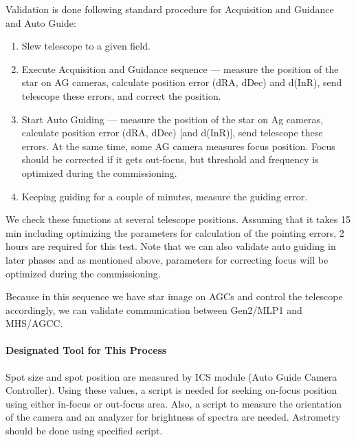 Validation is done following standard procedure for Acquisition and Guidance and Auto Guide:
\begin{enumerate}
\item Slew telescope to a given field.
\item Execute Acquisition and Guidance sequence --- measure the position of the star on AG cameras, calculate position error (dRA, dDec) and d(InR), send telescope these errors, and correct the position.
\item Start Auto Guiding --- measure the position of the star on Ag cameras, calculate position error (dRA, dDec) [and d(InR)], send telescope these errors.
At the same time, some AG camera measures focus position.
Focus should be corrected if it gets out-focus, but threshold and frequency is optimized during the commissioning.
\item Keeping guiding for a couple of minutes, measure the guiding error.
\end{enumerate}


We check these functions at several telescope positions.
Assuming that it takes 15 min including optimizing the parameters for calculation of the pointing errors, 2 hours are required for this test.
Note that we can also validate auto guiding in later phases and as mentioned above, parameters for correcting focus will be optimized during the commissioning.

\smallskip

Because in this sequence we have star image on AGCs  and control the telescope accordingly, we can validate communication between Gen2/MLP1 and MHS/AGCC.

\paragraph{Designated Tool for This Process}
Spot size and spot position are measured by ICS module (Auto Guide Camera Controller).
Using these values, a script is needed for seeking on-focus position using either in-focus or out-focus area.
Also, a script to measure the orientation of the camera and an analyzer for brightness of spectra are needed.
Astrometry should be done using specified script.

